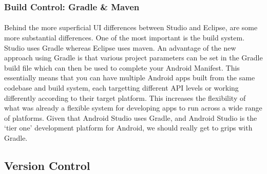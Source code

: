 

\subsubsection{Build Control: Gradle \& Maven}
\paragraph{} Behind the more superficial UI differences between Studio and Eclipse, are some more substantial differences. One of the most important is the build system. Studio uses Gradle whereas Eclipse uses maven. An advantage of the new approach using Gradle is that various project parameters can be set in the Gradle build file which can then be used to complete your Android Manifest. This essentially means that you can have multiple Android apps built from the same codebase and build system, each targetting different API levels or working differently according to their target platform. This increases the flexibility of what was already a flexible system for developing apps to run across a wide range of platforms. Given that Android Studio uses Gradle, and Android Studio is the `tier one' development platform for Android, we should really get to grips with Gradle.

\subsection{Version Control}
